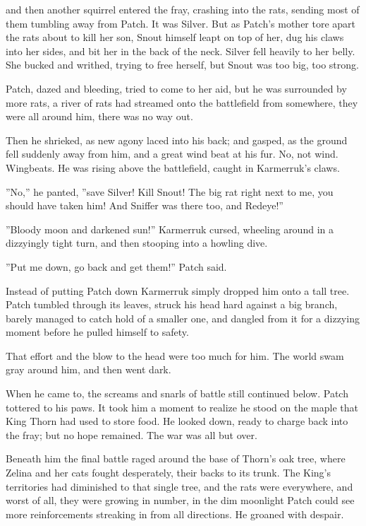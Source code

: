 \documentclass[12pt]{book}
\begin{document}
\par
 and then another squirrel entered the fray, crashing into the rats, sending most of them tumbling away from Patch. It was Silver. But as Patch's mother tore apart the rats about to kill her son, Snout himself leapt on top of her, dug his claws into her sides, and bit her in the back of the neck. Silver fell heavily to her belly. She bucked and writhed, trying to free herself, but Snout was too big, too strong.\par
Patch, dazed and bleeding, tried to come to her aid, but he was surrounded by more rats, a river of rats had streamed onto the battlefield from somewhere, they were all around him, there was no way out.\par
 Then he shrieked, as new agony laced into his back; and gasped, as the ground fell suddenly away from him, and a great wind beat at his fur. No, not wind. Wingbeats. He was rising above the battlefield, caught in Karmerruk's claws.\par
 ''No,'' he panted, ''save Silver! Kill Snout! The big rat right next to me, you should have taken him! And Sniffer was there too, and Redeye!''\par
 ''Bloody moon and darkened sun!'' Karmerruk cursed, wheeling around in a dizzyingly tight turn, and then stooping into a howling dive.\par
 ''Put me down, go back and get them!'' Patch said.\par
 Instead of putting Patch down Karmerruk simply dropped him onto a tall tree. Patch tumbled through its leaves, struck his head hard against a big branch, barely managed to catch hold of a smaller one, and dangled from it for a dizzying moment before he pulled himself to safety.\par
That effort and the blow to the head were too much for him. The world swam gray around him, and then went dark.\par
 When he came to, the screams and snarls of battle still continued below. Patch tottered to his paws. It took him a moment to realize he stood on the maple that King Thorn had used to store food. He looked down, ready to charge back into the fray; but no hope remained. The war was all but over.\par
 Beneath him the final battle raged around the base of Thorn's oak tree, where Zelina and her cats fought desperately, their backs to its trunk. The King's territories had diminished to that single tree, and the rats were everywhere, and worst of all, they were growing in number, in the dim moonlight Patch could see more reinforcements streaking in from all directions. He groaned with despair.\par
\end{document}
